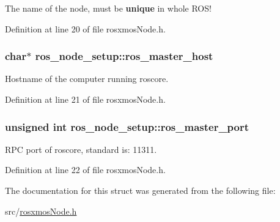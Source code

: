 \-The name of the node, must be {\bfseries unique} in whole \-R\-O\-S! 



\-Definition at line 20 of file rosxmos\-Node.\-h.

\hypertarget{structros__node__setup_a8a95e9beff3361bb74a4a30dd3c50ba0}{
\subsubsection[{ros\-\_\-master\-\_\-host}]{\setlength{\rightskip}{0pt plus 5cm}char$\ast$ {\bf ros\-\_\-node\-\_\-setup\-::ros\-\_\-master\-\_\-host}}}\label{structros__node__setup_a8a95e9beff3361bb74a4a30dd3c50ba0}


\-Hostname of the computer running roscore. 



\-Definition at line 21 of file rosxmos\-Node.\-h.

\hypertarget{structros__node__setup_a690ae2d601b53fca47aba50557a6b214}{
\subsubsection[{ros\-\_\-master\-\_\-port}]{\setlength{\rightskip}{0pt plus 5cm}unsigned int {\bf ros\-\_\-node\-\_\-setup\-::ros\-\_\-master\-\_\-port}}}\label{structros__node__setup_a690ae2d601b53fca47aba50557a6b214}


\-R\-P\-C port of roscore, standard is\-: 11311. 



\-Definition at line 22 of file rosxmos\-Node.\-h.



\-The documentation for this struct was generated from the following file\-:\begin{DoxyCompactItemize}
\item 
src/\hyperlink{rosxmosNode_8h}{rosxmos\-Node.\-h}\end{DoxyCompactItemize}
